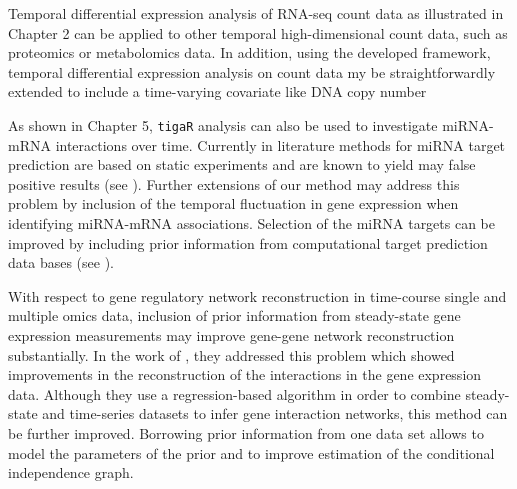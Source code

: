 \begin{conclusion}
\begin{compactitem}
\item Temporal differential expression analysis of RNA-seq count data as illustrated in Chapter 2 can be applied to other temporal high-dimensional count data, such as proteomics or metabolomics data. In addition, using the developed framework, temporal differential expression analysis on count data my be straightforwardly extended to include a time-varying covariate like DNA copy number 

\item As shown in Chapter 5, {\tt tigaR} analysis can also be used to investigate miRNA-mRNA interactions over time. Currently in literature methods for miRNA target prediction are based on static experiments and are known to yield may false positive results (see \cite{Pinzon2017}). Further extensions of our method may address this problem by inclusion of the temporal fluctuation in gene expression when identifying miRNA-mRNA associations. Selection of the miRNA targets can be improved by including prior information from computational target prediction data bases (see \cite{Tabas2014}). 
\end{compactitem}

With respect to gene regulatory network reconstruction in time-course single and multiple omics data, inclusion of prior information from steady-state gene
expression measurements may improve gene-gene network reconstruction substantially. In the work of \cite{Wang2013}, they addressed this problem which
showed improvements in the reconstruction of the interactions in the gene expression data. Although they use a regression-based algorithm in order to combine steady-state and time-series datasets to infer gene interaction networks, this method can be further improved. Borrowing prior information from one data
set allows to model the parameters of the prior and to improve estimation of the conditional independence graph.


\end{conclusion}
